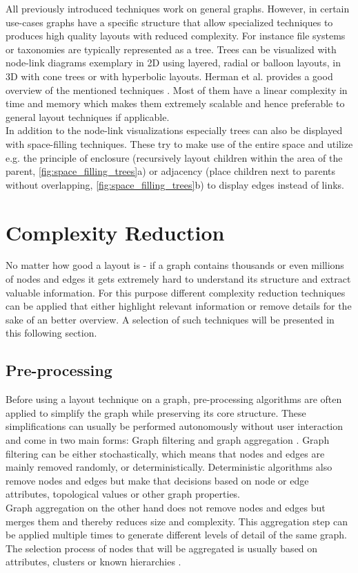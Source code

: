 All previously introduced techniques work on general graphs. However, in certain use-cases graphs have a specific structure that allow specialized techniques to produces high quality layouts with reduced complexity. For instance file systems or taxonomies are typically represented as a tree. Trees can be visualized with node-link diagrams exemplary in 2D using layered, radial or balloon layouts, in 3D with cone trees or with hyperbolic layouts. Herman et al. provides a good overview of the mentioned techniques \cite{Herman2000}. Most of them have a linear complexity in time and memory which makes them extremely scalable and hence preferable to general layout techniques if applicable. \\
In addition to the node-link visualizations especially trees can also be displayed with space-filling techniques. These try to make use of the entire space and utilize e.g. the principle of enclosure (recursively layout children within the area of the parent, \autoref{fig:space_filling_trees}a) or adjacency (place children next to parents without overlapping, \autoref{fig:space_filling_trees}b) to display edges instead of links\cite{VonLandesberger2011}.



\section{Complexity Reduction}
No matter how good a layout is - if a graph contains thousands or even millions of nodes and edges it gets extremely hard to understand its structure and extract valuable information. For this purpose different complexity reduction techniques can be applied that either highlight relevant information or remove details for the sake of an better overview. A selection of such techniques will be presented in this following section.

\subsection{Pre-processing}
Before using a layout technique on a graph, pre-processing algorithms are often applied to simplify the graph while preserving its core structure. These simplifications can usually be performed autonomously without user interaction and come in two main forms: Graph filtering and graph aggregation \cite{VonLandesberger2011}.
Graph filtering can be either stochastically, which means that nodes and edges are mainly removed randomly, or deterministically. Deterministic algorithms also remove nodes and edges but make that decisions based on node or edge attributes, topological values or other graph properties.\\
Graph aggregation on the other hand does not remove nodes and edges but merges them and thereby reduces size and complexity. This aggregation step can be applied multiple times to generate different levels of detail of the same graph. The selection process of nodes that will be aggregated is usually based on attributes, clusters or known hierarchies \cite{VonLandesberger2011}.

